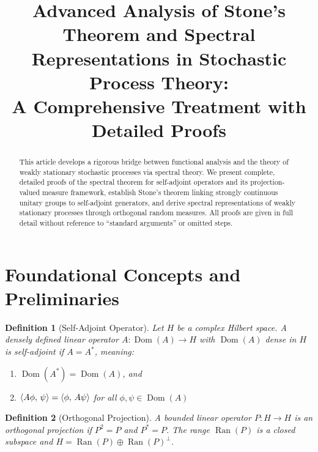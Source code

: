 \documentclass{article}
\newcommand{\tmem}[1]{{\em #1\/}}
\newcommand{\tmop}[1]{\ensuremath{\operatorname{#1}}}
\newtheorem{definition}{Definition}
\newcommand{\1}{\mathbbm{1}}
\newcommand{\ip}[2]{\left\langle #1, \hspace{0.17em} #2  \right\rangle}
\newcommand{\Dom}{\tmop{Dom}}
\newcommand{\Ran}{\tmop{Ran}}
\begin{document}
\title{
  Advanced Analysis of Stone's Theorem and Spectral Representations in
  Stochastic Process Theory:\\
  A Comprehensive Treatment with Detailed Proofs
}

\date{}

\maketitle

\begin{abstract}
  This article develops a rigorous bridge between functional analysis and the
  theory of weakly stationary stochastic processes via spectral theory. We
  present complete, detailed proofs of the spectral theorem for self-adjoint
  operators and its projection-valued measure framework, establish Stone's
  theorem linking strongly continuous unitary groups to self-adjoint
  generators, and derive spectral representations of weakly stationary
  processes through orthogonal random measures. All proofs are given in full
  detail without reference to ``standard arguments'' or omitted steps.
\end{abstract}

{\tableofcontents}

\section{Foundational Concepts and Preliminaries}

\begin{definition}
  [Self-Adjoint Operator] Let $H$ be a complex Hilbert space. A densely
  defined linear operator $A : \Dom (A) \to H$ with $\Dom (A)$ dense in $H$ is
  {\tmem{self-adjoint}} if $A = A^{\ast}$, meaning:
  \begin{enumerate}
    \item $\Dom (A^{\ast}) = \Dom (A)$, and
    
    \item $\ip{A \phi}{\psi} = \ip{\phi}{A \psi}$ for all $\phi, \psi \in \Dom
    (A)$
  \end{enumerate}
\end{definition}

\begin{definition}
  [Orthogonal Projection] A bounded linear operator $P : H \to H$ is an
  {\tmem{orthogonal projection}} if $P^2 = P$ and $P^{\ast} = P$. The range
  $\Ran (P)$ is a closed subspace and $H = \Ran (P) \oplus \Ran (P)^{\perp}$.
\end{definition}
\end{document}

